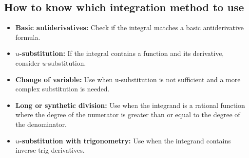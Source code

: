 \documentclass[letterpaper, 12pt]{article}
\begin{document}
\subsection*{How to know which integration method to use}

\begin{itemize}
    \item \textbf{Basic antiderivatives:} Check if the integral matches a basic antiderivative formula.
    \item \textbf{$u$-substitution:} If the integral contains a function and its derivative, consider $u$-substitution.
    \item \textbf{Change of variable:} Use when u-substitution is not sufficient and a more complex substitution is needed.
    \item \textbf{Long or synthetic division:} Use when the integrand is a rational function where the degree of the numerator is greater than or equal to the degree of the denominator.
    \item \textbf{$u$-substitution with trigonometry:} Use when the integrand contains inverse trig derivatives.
\end{itemize}
    
\end{document}
